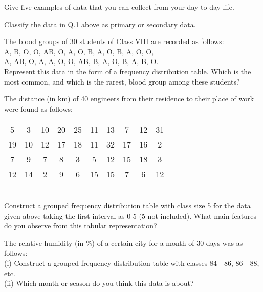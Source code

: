 
	\item Give five examples of data that you can collect from your day-to-day life.\\
	\item  Classify the data in Q.1 above as primary or secondary data.\\
	\item The blood groups of 30 students of Class VIII are recorded as follows:\\
A, B, O, O, AB, O, A, O, B, A, O, B, A, O, O,\\
A, AB, O, A, A, O, O, AB, B, A, O, B, A, B, O.\\
Represent this data in the form of a frequency distribution table. Which is the most common, and which is the rarest, blood group among these students?\\
\item The distance (in km) of 40 engineers from their residence to their place of work were
found as follows:
\begin{tabular}{ |c|c|c|c|c|c|c|c|c|c| } 
 5 &3 &10 &20 &25 &11 &13 &7 &12 &31  \\ 
 19 &10 &12 &17 &18 &11 &32 &17 &16 &2\\ 
 7 &9 &7 &8 &3 &5 &12 &15 &18 &3  \\ 
 12 &14 &2 &9 &6 &15 &15 &7 &6 &12\\ 
\end{tabular}\\
Construct a grouped frequency distribution table with class size 5 for the data given above taking the first interval as 0-5 (5 not included). What main features do you observe from this tabular representation?\\
\item The relative humidity (in $\%$) of a certain city for a month of 30 days was as follows:\\
(i) Construct a grouped frequency distribution table with classes 84 - 86, 86 - 88, etc.\\
(ii) Which month or season do you think this data is about?\\
